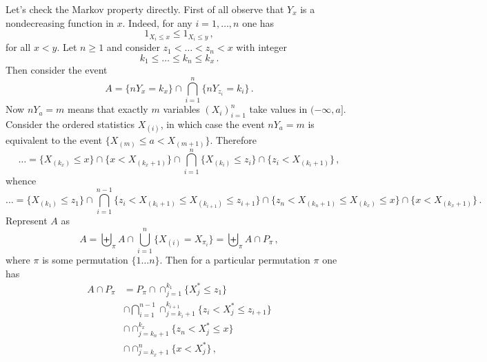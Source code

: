 Let's check the Markov property directly. First of all observe that $Y_x$ is
a nondecreasing function in $x$. Indeed, for any $i=1,\ldots,n$ one has
\[ 1_{X_i\leq x} \leq 1_{X_i\leq y} \,,\]
for all $x<y$. Let $n\geq1$ and consider $z_1<\ldots<z_n<x$ with integer
\[  k_1\leq \ldots \leq k_n \leq k_x \,. \]
Then consider the event
\[ A = \{ nY_x = k_x\} \cap \bigcap_{i=1}^n \{ nY_{z_i} = k_i\} \,. \]
Now $nY_a = m$ means that exactly $m$ variables $(X_i)_{i=1}^n$ take values in
$(-\infty, a]$. Consider the ordered statistics $X_{(i)}$, in which case the event
$nY_a = m$ is equivalent to the event $\{ X_{(m)}\leq a < X_{(m+1)} \}$. Therefore
\[ \ldots = \{ X_{(k_x)} \leq x\} \cap \{ x < X_{(k_x+1)} \}
	\cap \bigcap_{i=1}^n \{ X_{(k_i)} \leq z_i\} \cap \{ z_i < X_{(k_i+1)} \} \,, \]
whence
\[\ldots =
\{ X_{(k_1)} \leq z_1\}
	\cap \bigcap_{i=1}^{n-1} \{ z_i < X_{(k_i+1)} \leq X_{(k_{i+1})} \leq z_{i+1}\}
	\cap \{ z_n < X_{(k_n+1)} \leq X_{(k_x)} \leq x \} \cap \{ x < X_{(k_x+1)} \}
\,. \]
Represent $A$ as 
\[ A = \biguplus_\pi A \cap \bigcup_{i=1}^n \{ X_{(i)} = X_{\pi_i}\} = \biguplus_\pi A \cap P_\pi \,,\]
where $\pi$ is some permutation $\{1\ldots n\}$. Then for a particular permutation
$\pi$ one has
\begin{align*}
	A \cap P_\pi &= P_\pi \cap \cap_{j=1}^{k_1} \{ X^*_j \leq z_1\} \\
		&\cap \bigcap_{i=1}^{n-1} \cap_{j=k_i+1}^{k_{i+1}} \{ z_i < X^*_j \leq z_{i+1} \} \\
		&\cap \cap_{j=k_n+1}^{k_x} \{ z_n < X^*_j \leq x \} \\
		&\cap \cap_{j=k_x+1}^n \{ x < X^*_j \} \,,
\end{align*}



